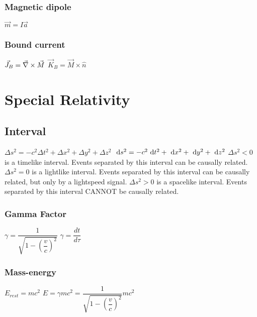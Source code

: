\subsubsection{Magnetic dipole}
\begin{itemize}
\itemt \( \vec{m} = I\vec{a} \)
\end{itemize}

\subsubsection{Bound current}
\begin{itemize}
\itemt \( \vec{J}_B = \vec{\nabla}\times \vec{M} \)
\itemt \( \vec{K}_B = \vec{M}\times\hat{n} \)
\end{itemize}


	\section{Special Relativity}

\subsection{Interval}
\begin{itemize}
\itemt \( \Delta s^2 = -c^2\Delta t^2 + \Delta x^2 +\Delta y^2 +\Delta z^2 \)
\itemt \( \ \mathrm{d}s^2 = -c^2\ \mathrm{d}t^2 + \ \mathrm{d}x^2 + \ \mathrm{d}y^2 + \ \mathrm{d}z^2 \)
\itemt \( \Delta s^2 < 0 \) is a timelike interval. Events separated by this interval can be causally related.
\itemt \( \Delta s^2 = 0 \) is a lightlike interval. Events separated by this interval can be causally related, but only by a lightspeed signal.
\itemt \( \Delta s^2 > 0 \) is a spacelike interval. Events separated  by this interval CANNOT be causally related.
\end{itemize}

\subsubsection{Gamma Factor}		
\begin{itemize}
\itemt \( \gamma = \dfrac{1}{\sqrt{1-(\dfrac{v}{c})^2}} \)
\itemt \( \gamma = \dfrac{dt}{d\tau} \)
\end{itemize}		

\subsubsection{Mass-energy}
\begin{itemize}
\itemt \( E_{rest} = mc^2\)
\itemt \( E = \gamma mc^2 = \dfrac{1}{\sqrt{1-(\dfrac{v}{c})^2}}mc^2 \)
\end{itemize}

